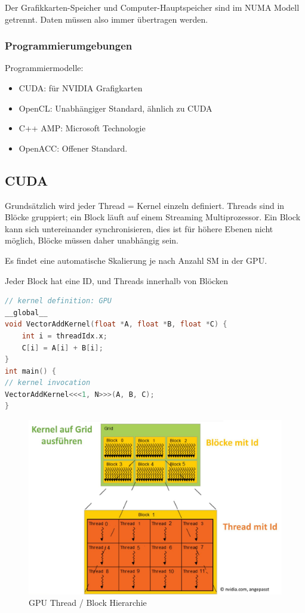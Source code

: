 Der Grafikkarten-Speicher und Computer-Hauptspeicher sind im NUMA Modell getrennt. Daten müssen also immer übertragen werden.


\subsubsection{Programmierumgebungen}

Programmiermodelle:
\begin{itemize}
	\item CUDA: für NVIDIA Grafigkarten
	\item OpenCL: Unabhängiger Standard, ähnlich zu CUDA
	\item C++ AMP: Microsoft Technologie
	\item OpenACC: Offener Standard.
\end{itemize}

\subsection{CUDA}


Grundsätzlich wird jeder Thread = Kernel einzeln definiert. Threads sind in Blöcke gruppiert; ein Block läuft auf einem Streaming Multiprozessor. Ein Block kann sich untereinander synchronisieren, dies ist für höhere Ebenen nicht möglich, Blöcke müssen daher unabhängig sein. 

Es findet eine automatische Skalierung je nach Anzahl SM in der GPU.

Jeder Block hat eine ID, und Threads innerhalb von Blöcken

\begin{lstlisting}[language=C++]
// kernel definition: GPU
__global__
void VectorAddKernel(float *A, float *B, float *C) {
	int i = threadIdx.x;
	C[i] = A[i] + B[i];
}
int main() {
// kernel invocation
VectorAddKernel<<<1, N>>>(A, B, C);
}
\end{lstlisting}

\begin{figure}[h]
	\centering
	\includegraphics[width=0.7\linewidth]{img/gpu_thread_hierarchie.jpg}
	\caption{GPU Thread / Block Hierarchie}
	\label{fig:gputhradhierarchie}
\end{figure}

